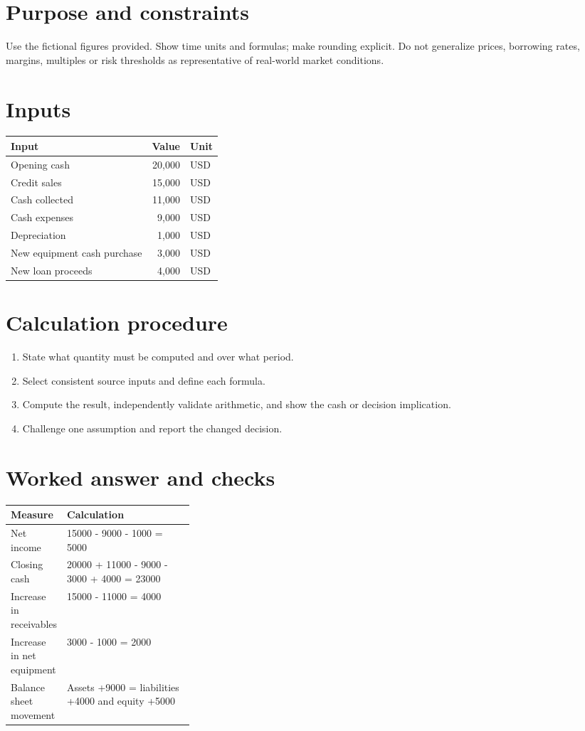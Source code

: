 \documentclass[11pt]{article}
\begin{document}
\SuiteOpen
\section{Purpose and constraints}
Use the fictional figures provided. Show time units and formulas; make rounding explicit. Do not generalize prices, borrowing rates, margins, multiples or risk thresholds as representative of real-world market conditions.
\section{Inputs}
\begin{tabularx}{\linewidth}{@{}Y r l@{}}\toprule Input & Value & Unit\\\midrule
Opening cash & 20,000 & USD\\
Credit sales & 15,000 & USD\\
Cash collected & 11,000 & USD\\
Cash expenses & 9,000 & USD\\
Depreciation & 1,000 & USD\\
New equipment cash purchase & 3,000 & USD\\
New loan proceeds & 4,000 & USD\\
\bottomrule\end{tabularx}
\section{Calculation procedure}
\begin{enumerate}[leftmargin=*,itemsep=5pt]
\item State what quantity must be computed and over what period.
\item Select consistent source inputs and define each formula.
\item Compute the result, independently validate arithmetic, and show the cash or decision implication.
\item Challenge one assumption and report the changed decision.
\end{enumerate}

\section{Worked answer and checks}
\begin{tabularx}{\linewidth}{@{}p{0.30\linewidth}Y@{}}\toprule Measure & Calculation\\\midrule
Net income & 15000 - 9000 - 1000 = 5000\\
Closing cash & 20000 + 11000 - 9000 - 3000 + 4000 = 23000\\
Increase in receivables & 15000 - 11000 = 4000\\
Increase in net equipment & 3000 - 1000 = 2000\\
Balance sheet movement & Assets +9000 = liabilities +4000 and equity +5000\\
\bottomrule\end{tabularx}
\end{document}
